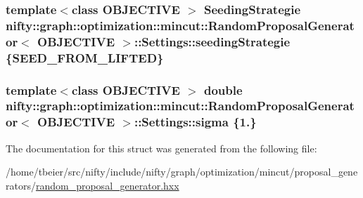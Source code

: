 \subsubsection[{seeding\+Strategie}]{\setlength{\rightskip}{0pt plus 5cm}template$<$class O\+B\+J\+E\+C\+T\+I\+V\+E $>$ {\bf Seeding\+Strategie} {\bf nifty\+::graph\+::optimization\+::mincut\+::\+Random\+Proposal\+Generator}$<$ O\+B\+J\+E\+C\+T\+I\+V\+E $>$\+::Settings\+::seeding\+Strategie \{{\bf S\+E\+E\+D\+\_\+\+F\+R\+O\+M\+\_\+\+L\+I\+F\+T\+E\+D}\}}\label{structnifty_1_1graph_1_1optimization_1_1mincut_1_1RandomProposalGenerator_1_1Settings_a1ce25bfa58914e52b416ebcc86afa58a}
\hypertarget{structnifty_1_1graph_1_1optimization_1_1mincut_1_1RandomProposalGenerator_1_1Settings_af7b756a9ed00baf43346835dcdc86f9b}{}
\subsubsection[{sigma}]{\setlength{\rightskip}{0pt plus 5cm}template$<$class O\+B\+J\+E\+C\+T\+I\+V\+E $>$ double {\bf nifty\+::graph\+::optimization\+::mincut\+::\+Random\+Proposal\+Generator}$<$ O\+B\+J\+E\+C\+T\+I\+V\+E $>$\+::Settings\+::sigma \{1.\}}\label{structnifty_1_1graph_1_1optimization_1_1mincut_1_1RandomProposalGenerator_1_1Settings_af7b756a9ed00baf43346835dcdc86f9b}


The documentation for this struct was generated from the following file\+:\begin{DoxyCompactItemize}
\item 
/home/tbeier/src/nifty/include/nifty/graph/optimization/mincut/proposal\+\_\+generators/\hyperlink{random__proposal__generator_8hxx}{random\+\_\+proposal\+\_\+generator.\+hxx}\end{DoxyCompactItemize}

